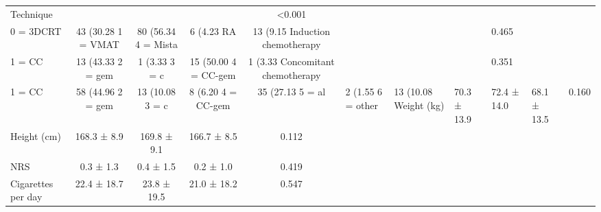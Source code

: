 \begin{table}[!ht]
\begin{tabular}{lcccc}
Technique & & & & <0.001 \\
\hspace{3mm} 0 = 3DCRT & 43 (30.28%
\hspace{3mm} 1 = VMAT & 80 (56.34%
\hspace{3mm} 4 = Mista & 6 (4.23%
\hspace{3mm} RA & 13 (9.15%
Induction chemotherapy & & & & 0.465 \\
\hspace{3mm} 1 = CC & 13 (43.33%
\hspace{3mm} 2 = gem & 1 (3.33%
\hspace{3mm} 3 = c & 15 (50.00%
\hspace{3mm} 4 = CC-gem & 1 (3.33%
Concomitant chemotherapy & & & & 0.351 \\
\hspace{3mm} 1 = CC & 58 (44.96%
\hspace{3mm} 2 = gem & 13 (10.08%
\hspace{3mm} 3 = c & 8 (6.20%
\hspace{3mm} 4 = CC-gem & 35 (27.13%
\hspace{3mm} 5 = al & 2 (1.55%
\hspace{3mm} 6 = other & 13 (10.08%
Weight (kg) & 70.3 ± 13.9 & 72.4 ± 14.0 & 68.1 ± 13.5 & 0.160 \\
Height (cm) & 168.3 ± 8.9 & 169.8 ± 9.1 & 166.7 ± 8.5 & 0.112 \\
NRS & 0.3 ± 1.3 & 0.4 ± 1.5 & 0.2 ± 1.0 & 0.419 \\
Cigarettes per day & 22.4 ± 18.7 & 23.8 ± 19.5 & 21.0 ± 18.2 & 0.547 \\

\end{tabular}
\end{table}
